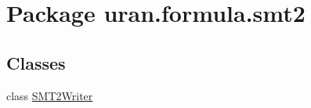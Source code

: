 \hypertarget{namespaceuran_1_1formula_1_1smt2}{}\section{Package uran.\+formula.\+smt2}
\label{namespaceuran_1_1formula_1_1smt2}
\subsection*{Classes}
\begin{DoxyCompactItemize}
\item 
class \hyperlink{classuran_1_1formula_1_1smt2_1_1_s_m_t2_writer}{S\+M\+T2\+Writer}
\end{DoxyCompactItemize}
